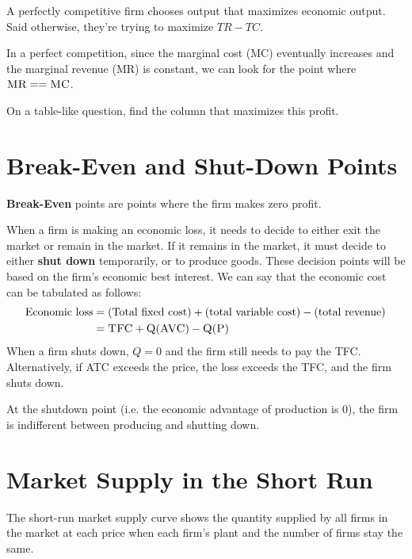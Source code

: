                 A perfectly competitive firm chooses output that maximizes economic output.
                Said otherwise, they're trying to maximize $TR - TC$.

                In a perfect competition, since the marginal cost (\textsc{MC}) eventually increases and the marginal revenue (\textsc{MR}) is constant, we can look for the point where $\textsc{MR} == \textsc{MC}$.

                On a table-like question, find the column that maximizes this profit.
            \section{Break-Even and Shut-Down Points} %
            \label{sec:break_even_and_shut_down_points}
                \textbf{Break-Even} points are points where the firm makes zero profit.

                When a firm is making an economic loss, it needs to decide to either exit the market or remain in the market.
                If it remains in the market, it must decide to either \textbf{shut down} temporarily, or to produce goods.
                These decision points will be based on the firm's economic best interest.
                We can say that the economic cost can be tabulated as follows:
                \begin{align*}
                    \text{Economic loss} &= (\text{Total fixed cost}) + (\text{total variable cost}) - (\text{total revenue}) \\
                    &= \textsc{TFC} + \textsc{Q}(\textsc{AVC}) - \textsc{Q}(\textsc{P})
                \end{align*}
                When a firm shuts down, $Q=0$ and the firm still needs to pay the \textsc{TFC}.
                Alternatively, if \textsc{ATC} exceeds the price, the loss exceeds the \textsc{TFC}, and the firm shuts down.

                At the shutdown point (i.e. the economic advantage of production is 0), the firm is indifferent between producing and shutting down.
            \section{Market Supply in the Short Run} %
            \label{sec:market_supply_in_the_short_run}
                The short-run market supply curve shows the quantity supplied by all firms in the market at each price when each firm's plant and the number of firms stay the same.

